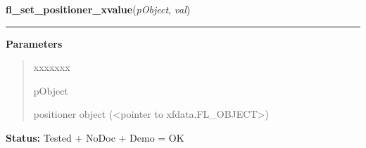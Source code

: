     \label{xformslib:library:fl_set_positioner_xvalue}

    \vspace{0.5ex}

\hspace{.8\funcindent}\begin{boxedminipage}{\funcwidth}

    \raggedright \textbf{fl\_set\_positioner\_xvalue}(\textit{pObject}, \textit{val})

    \vspace{-1.5ex}

    \rule{\textwidth}{0.5\fboxrule}
\setlength{\parskip}{2ex}
\setlength{\parskip}{1ex}
      \textbf{Parameters}
      \vspace{-1ex}

      \begin{quote}
        \begin{Ventry}{xxxxxxx}

          \item[pObject]

          positioner object ({\textless}pointer to 
          xfdata.FL\_OBJECT{\textgreater})

        \end{Ventry}

      \end{quote}

\textbf{Status:} Tested + NoDoc + Demo = OK



    \end{boxedminipage}

    \label{xformslib:library:fl_get_positioner_xvalue}

    \vspace{0.5ex}

